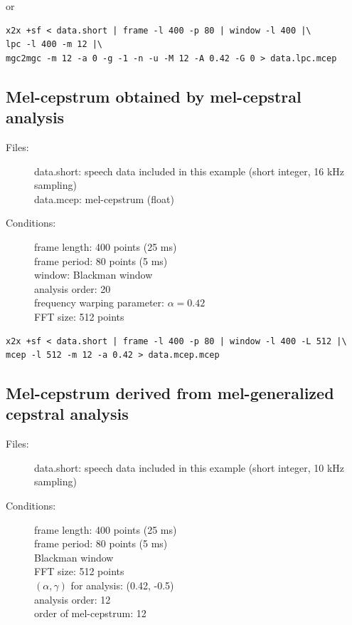 \documentclass[a4paper,10pt]{article}
\begin{document}
or

\begin{verbatim}
x2x +sf < data.short | frame -l 400 -p 80 | window -l 400 |\
lpc -l 400 -m 12 |\
mgc2mgc -m 12 -a 0 -g -1 -n -u -M 12 -A 0.42 -G 0 > data.lpc.mcep
\end{verbatim}

\subsection{Mel-cepstrum obtained by mel-cepstral analysis}

\begin{description}
\item[Files:]
  data.short: speech data included in this example (short integer, 16 kHz sampling)\\
  data.mcep: mel-cepstrum (float)
\item[Conditions:]
  frame length: 400 points (25 ms)\\
  frame period: 80 points (5 ms)\\
  window: Blackman window\\
  analysis order: 20 \\
  frequency warping parameter: $\alpha = 0.42$\\
  FFT size: 512 points
\end{description}

\begin{verbatim}
x2x +sf < data.short | frame -l 400 -p 80 | window -l 400 -L 512 |\
mcep -l 512 -m 12 -a 0.42 > data.mcep.mcep
\end{verbatim}

\subsection{Mel-cepstrum derived from mel-generalized cepstral analysis}

\begin{description}
\item[Files:]
   data.short: speech data included in this example (short integer, 10 kHz sampling)\\
\item[Conditions:]
  frame length: 400 points (25 ms)\\
  frame period: 80 points (5 ms)\\
  Blackman window\\
  FFT size: 512 points\\
  $(\alpha, \gamma)$ for analysis: (0.42, -0.5)\\
  analysis order: 12\\
  order of mel-cepstrum: 12
\end{description}
\end{document}
